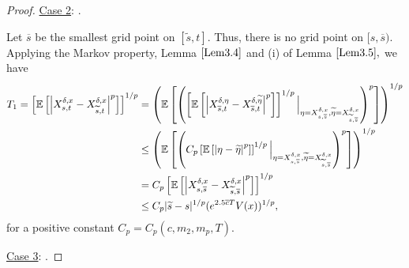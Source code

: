 \documentclass[11pt]{article}
\theoremstyle{theorem}
\theoremstyle{definition}
\newcommand{\bR}{\mathbb{R}}
\newcommand{\1}{{\bf 1}}
\begin{document}
\begin{proof}
\noindent\underline{Case 2}: .

Let $\overline{s}$ be the smallest grid point on $[\widetilde{s}, t].$
Thus, there is no grid point on $[s, \overline{s})$. Applying the Markov property, Lemma $\ref{Lem3.4}$ 
and (i) of Lemma $\ref{Lem3.5},$  we have
\begin{align} T_1 =\left[\mathbb{E}\left[\left|X^{\delta, x}_{s,t}-X^{\delta, x}_{\widetilde{s},t}\right|^p\right]\right]^{1/p} &= \left(\mathbb{E}\left[\left(\left[\mathbb{E}\left[\left|X^{\delta,\eta}_{\overline{s},t}-X^{\delta, \widetilde{\eta}}_{\overline{s},t}\right|^p\right]\right]^{1/p}\Big | _{\eta = X^{\delta, x}_{s,\overline{s}}, \widetilde{\eta} = X^{\delta, x}_{\widetilde{s},\overline{s}} } \right)^p\right]\right)^{1/p} \notag   \\
 & \leq \left(\mathbb{E}\left[\left( C_p \left[\mathbb{E}\left[\left|\eta-\widetilde{\eta}\right|^p\right]\right]^{1/p}\Big | _{\eta = X^{\delta, x}_{s,\overline{s}}, \widetilde{\eta} = X^{\delta, x}_{\widetilde{s},\overline{s}} } \right)^p\right]\right)^{1/p} \notag   \\
 & = C_p \left[\mathbb{E}\left[\left|X^{\delta, x}_{s,\overline{s}}-X^{\delta, x}_{\widetilde{s},\overline{s}}\right|^p\right]\right]^{1/p}  \notag\\
 & \le C_p |\widetilde{s} -s|^{1/p} (e^{2.5\overline{c}T}V(x))^{1/p},
 \label{stiles}
\end{align}
for a positive constant $C_p=C_p(c, m_2, m_p, T).$ 

\noindent\underline{Case 3}: .


\end{proof}
\end{document}

